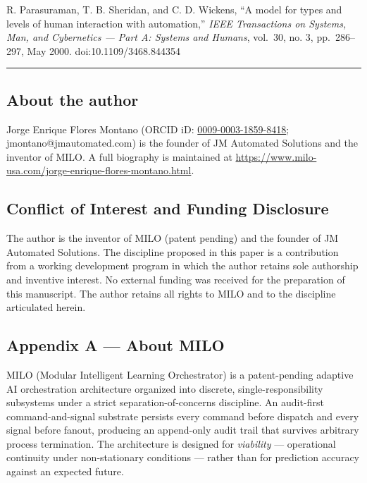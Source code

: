 \cite{ref13} R. Parasuraman, T. B. Sheridan, and C. D. Wickens, ``A model
for types and levels of human interaction with automation,'' \emph{IEEE
Transactions on Systems, Man, and Cybernetics --- Part A: Systems and
Humans}, vol.~30, no. 3, pp.~286--297, May 2000. doi:10.1109/3468.844354

\begin{center}\rule{0.5\linewidth}{0.5pt}\end{center}

\subsection{About the author}\label{about-the-author}

Jorge Enrique Flores Montano (ORCID iD:
\href{https://orcid.org/0009-0003-1859-8418}{0009-0003-1859-8418};
jmontano@jmautomated.com) is the founder of JM Automated Solutions and
the inventor of MILO. A full biography is maintained at
\url{https://www.milo-usa.com/jorge-enrique-flores-montano.html}.

\subsection{Conflict of Interest and Funding
Disclosure}\label{conflict-of-interest-and-funding-disclosure}

The author is the inventor of MILO (patent pending) and the founder of
JM Automated Solutions. The discipline proposed in this paper is a
contribution from a working development program in which the author
retains sole authorship and inventive interest. No external funding was
received for the preparation of this manuscript. The author retains all
rights to MILO and to the discipline articulated herein.

\subsection{Appendix A --- About MILO}\label{appendix-a-about-milo}

MILO (Modular Intelligent Learning Orchestrator) is a patent-pending
adaptive AI orchestration architecture organized into discrete,
single-responsibility subsystems under a strict separation-of-concerns
discipline. An audit-first command-and-signal substrate persists every
command before dispatch and every signal before fanout, producing an
append-only audit trail that survives arbitrary process termination. The
architecture is designed for \emph{viability} --- operational continuity
under non-stationary conditions --- rather than for prediction accuracy
against an expected future.

